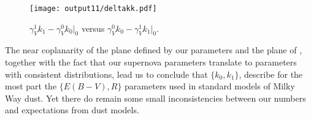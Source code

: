 \documentclass{aastex61}   	%
\begin{document}
\begin{figure}[htbp] %
   \centering
   \texttt{[image: output11/deltakk.pdf]}
      \caption{
      \color{purple}
      $\gamma^1_V k_1-\gamma^0_V k_0|_0$ versus $\gamma^0_V k_0-\gamma^1_V k_1|_0$.
      \color{black}
   \label{kk:fig}}
\end{figure}
%
%
%

%

The near coplanarity of the plane defined by our parameters and the plane of  , together with the fact that our  supernova
parameters translate to   parameters with consistent distributions, lead us to conclude that 
$\{k_0, k_1\}$, describe for the most part the $\{ E(B-V), R\}$ parameters used
in standard models of Milky Way dust.  Yet there do remain some small inconsistencies between our numbers and expectations from dust models.
\end{document}
